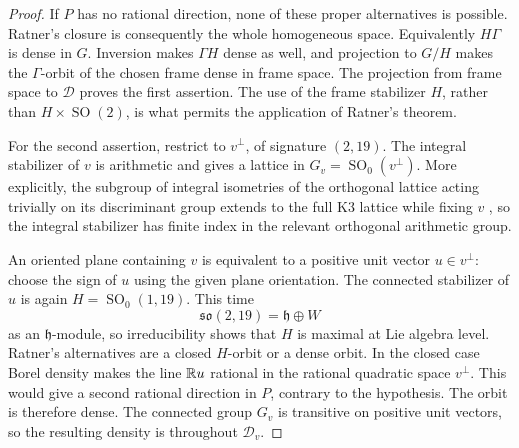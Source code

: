 \begin{proof}
If $P$ has no rational direction, none of these proper
alternatives is possible. Ratner's closure is consequently the
whole homogeneous space. Equivalently $H\Gamma$ is dense in
$G$. Inversion makes $\Gamma H$ dense as well, and projection
to $G/H$ makes the $\Gamma$-orbit of the chosen frame dense in
frame space.
The projection from frame space to $\mathcal D$ proves the first
assertion. The use of the frame stabilizer $H$, rather than
$H\times\operatorname{SO}(2)$, is what permits the application
of Ratner's theorem.

For the second assertion, restrict to $v^\perp$, of signature
$(2,19)$. The integral stabilizer of $v$ is arithmetic and gives
a lattice in $G_v=\operatorname{SO}_0(v^\perp)$. More explicitly,
the subgroup of integral isometries of the orthogonal lattice
acting trivially on its discriminant group extends to the full
K3 lattice while fixing $v$ \cite[Chapter~14, Section~2]{Huybrechts},
so the integral stabilizer has
finite index in the relevant orthogonal arithmetic group.

An oriented plane containing $v$ is equivalent to a positive
unit vector $u\in v^\perp$: choose the sign of $u$ using the
given plane orientation. The connected stabilizer of $u$ is
again $H=\operatorname{SO}_0(1,19)$. This time
\[
 \mathfrak{so}(2,19)=\mathfrak h\oplus W
\]
as an $\mathfrak h$-module, so irreducibility shows that $H$ is
maximal at Lie algebra level. Ratner's alternatives are a closed
$H$-orbit or a dense orbit. In the closed case Borel density
makes the line $\mathbb R u$ rational in the rational quadratic space
$v^\perp$. This would give a second rational direction in $P$,
contrary to the hypothesis. The orbit is therefore dense.
The connected group $G_v$ is transitive on positive unit
vectors, so the resulting density is throughout $\mathcal D_v$.
\end{proof}

